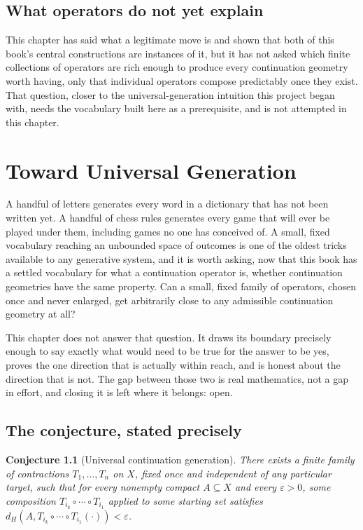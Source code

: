 \documentclass[11pt]{report}
\newtheorem{conjecture}{Conjecture}[chapter]
\begin{document}
\section*{What operators do not yet explain}

This chapter has said what a legitimate move is and shown that both
of this book's central constructions are instances of it, but it has
not asked which finite collections of operators are rich enough to
produce every continuation geometry worth having, only that individual
operators compose predictably once they exist. That question, closer
to the universal-generation intuition this project began with, needs
the vocabulary built here as a prerequisite, and is not attempted in
this chapter.

\chapter{Toward Universal Generation}

A handful of letters generates every word in a dictionary that has
not been written yet. A handful of chess rules generates every game
that will ever be played under them, including games no one has
conceived of. A small, fixed vocabulary reaching an unbounded space
of outcomes is one of the oldest tricks available to any generative
system, and it is worth asking, now that this book has a settled
vocabulary for what a continuation operator is, whether continuation
geometries have the same property. Can a small, fixed family of
operators, chosen once and never enlarged, get arbitrarily close to
any admissible continuation geometry at all?

This chapter does not answer that question. It draws its boundary
precisely enough to say exactly what would need to be true for the
answer to be yes, proves the one direction that is actually within
reach, and is honest about the direction that is not. The gap between
those two is real mathematics, not a gap in effort, and closing it is
left where it belongs: open.

\section*{The conjecture, stated precisely}

\begin{conjecture}[Universal continuation generation]
\label{conj:universal}
There exists a finite family of contractions $T_1, \dots, T_n$ on
$X$, fixed once and independent of any particular target, such that
for every nonempty compact $A \subseteq X$ and every $\varepsilon >
0$, some composition $T_{i_k} \circ \cdots \circ T_{i_1}$ applied to
some starting set satisfies $d_H(A, T_{i_k} \circ \cdots \circ
T_{i_1}(\cdot)) < \varepsilon$.
\end{conjecture}
\end{document}
